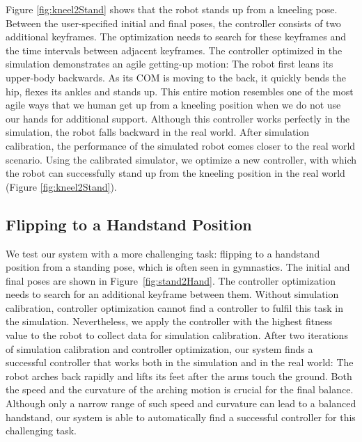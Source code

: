 Figure \ref{fig:kneel2Stand} shows that the robot stands up from a kneeling pose. Between the user-specified initial and final poses, the controller consists of two additional keyframes. The optimization needs to search for these keyframes and the time intervals between adjacent keyframes. The controller optimized in the simulation demonstrates an agile getting-up motion: The robot first leans its upper-body backwards. As its COM is moving to the back, it quickly bends the hip, flexes its ankles and stands up. This entire motion resembles one of the most agile ways that we human get up from a kneeling position when we do not use our hands for additional support. Although this controller works perfectly in the simulation, the robot falls backward in the real world. After simulation calibration, the performance of the simulated robot comes closer to the real world scenario. Using the calibrated simulator, we optimize a new controller, with which the robot can successfully stand up from the kneeling position in the real world (Figure \ref{fig:kneel2Stand}).

\subsection{Flipping to a Handstand Position}
We test our system with a more challenging task: flipping to a handstand position from a standing pose, which is often seen in gymnastics. The initial and final poses are shown in Figure~\ref{fig:stand2Hand}. The controller optimization needs to search for an additional keyframe between them. Without simulation calibration, controller optimization cannot find a controller to fulfil this task in the simulation. Nevertheless, we apply the controller with the highest fitness value to the robot to collect data for simulation calibration. After two iterations of simulation calibration and controller optimization, our system finds a successful controller that works both in the simulation and in the real world: The robot arches back rapidly and lifts its feet after the arms touch the ground. Both the speed and the curvature of the arching motion is crucial for the final balance. Although only a narrow range of such speed and curvature can lead to a balanced handstand, our system is able to automatically find a successful controller for this challenging task.

